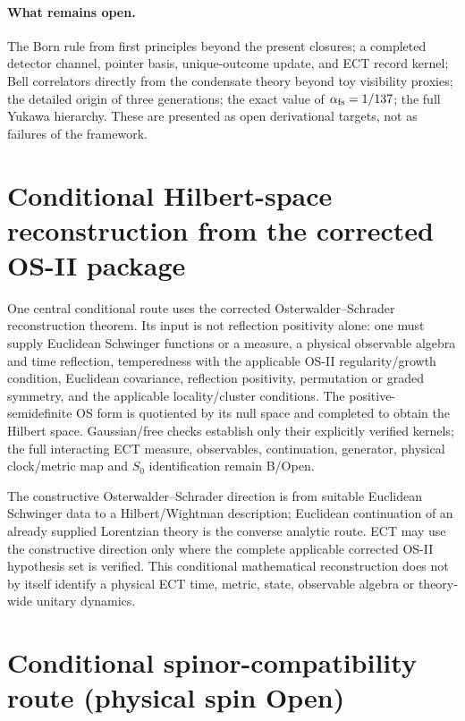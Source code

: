 \documentclass[11pt,a4paper]{article}
\begin{document}
\paragraph{What remains open.}
The Born rule from first principles beyond the present closures; a completed detector channel, pointer basis, unique-outcome update, and ECT record kernel; Bell correlators directly from the condensate theory beyond toy visibility proxies; the detailed origin of three generations; the exact value of $\alpha_{\rm fs}=1/137$; the full Yukawa hierarchy.  These are presented as open derivational targets, not as failures of the framework.


\section{Conditional Hilbert-space reconstruction from the corrected OS-II package}

One central conditional route uses the corrected Osterwalder--Schrader reconstruction theorem.  Its input is not reflection positivity alone: one must supply Euclidean Schwinger functions or a measure, a physical observable algebra and time reflection, temperedness with the applicable OS-II regularity/growth condition, Euclidean covariance, reflection positivity, permutation or graded symmetry, and the applicable locality/cluster conditions.  The positive-semidefinite OS form is quotiented by its null space and completed to obtain the Hilbert space.  Gaussian/free checks establish only their explicitly verified kernels; the full interacting ECT measure, observables, continuation, generator, physical clock/metric map and $S_0$ identification remain B/Open.

The constructive Osterwalder--Schrader direction is from suitable Euclidean
Schwinger data to a Hilbert/Wightman description; Euclidean continuation of
an already supplied Lorentzian theory is the converse analytic route.  ECT
may use the constructive direction only where the complete applicable
corrected OS-II hypothesis set is verified.  This conditional mathematical
reconstruction does not by itself identify a physical ECT time, metric,
state, observable algebra or theory-wide unitary dynamics.


\section{Conditional spinor-compatibility route (physical spin Open)}
\label{sec:pop_spin}
\end{document}
